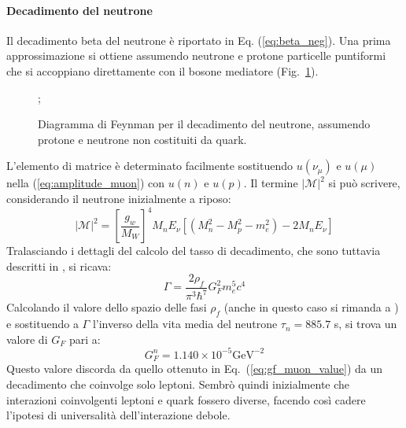 \documentclass{subnucbo}
\begin{document}
\paragraph{Decadimento del neutrone}
Il decadimento beta del neutrone è riportato in Eq. (\ref{eq:beta_neg}).
Una prima approssimazione si ottiene assumendo neutrone e protone particelle puntiformi che si accoppiano direttamente con il bosone mediatore (Fig.~\ref{fig:neutron_decay_simple}).
\begin{figure}[!h]
        \centering
        ;
        \caption{Diagramma di Feynman per il decadimento del neutrone, assumendo protone e neutrone non costituiti da quark.}
        \label{fig:neutron_decay_simple}
\end{figure}
L'elemento di matrice è determinato facilmente sostituendo $u(\nu_{\mu})$ e $u(\mu)$ nella (\ref{eq:amplitude_muon}) con $u(n)$ e $u(p)$. Il termine $|\mathcal{M}|^{2}$ si può scrivere, considerando il neutrone inizialmente a riposo:
\begin{equation}
        | \mathcal { M } | ^ { 2 } = \left[ \frac { g _ { w } } { M _ { W } } \right] ^ { 4 } M _ { n } E _ { \nu } \left[ \left( M _ { n } ^ { 2 } - M _ { p } ^ { 2 } - m _ { e } ^ { 2 } \right) - 2 M _ { n } E _ { \nu } \right]
\end{equation}
Tralasciando i dettagli del calcolo del tasso di decadimento, che sono tuttavia descritti in \cite{ref:hayes}, si ricava:
\begin{equation}
        \Gamma = \frac { 2 \rho_{f} } { \pi ^ { 3 } \hbar ^ { 7 } } G _ { F } ^ { 2 } m _ { e } ^ { 5 } c ^ { 4 }
        \label{eq:neutron_decay_rate}
\end{equation}
Calcolando il valore dello spazio delle fasi $\rho_{f}$ (anche in questo caso si rimanda a \cite{ref:hayes}) e sostituendo a $\Gamma$ l'inverso della vita media del neutrone $\tau_{n}=885.7$ s, si trova un valore di $G_{F}$ pari a:
\begin{equation}
        G^{n} _ { F } = 1.140 \times 10 ^ { - 5 } \mathrm { GeV } ^ { - 2 }
        \label{eq:gf_neutron_value}
\end{equation}
Questo valore discorda da quello ottenuto in Eq.~(\ref{eq:gf_muon_value}) da un decadimento che coinvolge solo leptoni. Sembrò quindi inizialmente che interazioni coinvolgenti leptoni e quark fossero diverse, facendo così cadere l'ipotesi di universalità dell'interazione debole.
\end{document}
